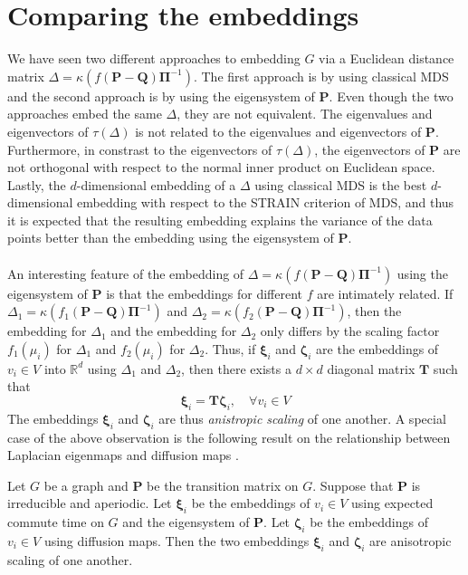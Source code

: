 \section{Comparing the embeddings}
\label{sec:comparing-embeddings}
\noindent
We have seen two different approaches to embedding $G$ via a Euclidean
distance matrix $\Delta = \kappa(f(\mathbf{P} -
\mathbf{Q})\bm{\Pi}^{-1})$. The first approach is by using classical
MDS and the second approach is by using the eigensystem of
$\mathbf{P}$.  Even though the two approaches embed the same $\Delta$,
they are not equivalent. The eigenvalues and eigenvectors of
$\tau(\Delta)$ is not related to the eigenvalues and eigenvectors of
$\mathbf{P}$. Furthermore, in constrast to the eigenvectors of
$\tau(\Delta)$, the eigenvectors of $\mathbf{P}$ are not orthogonal
with respect to the normal inner product on Euclidean space. Lastly,
the $d$-dimensional embedding of a $\Delta$ using classical MDS is the
best $d$-dimensional embedding with respect to the STRAIN criterion of
MDS, and thus it is expected that the resulting embedding explains the
variance of the data points better than the embedding using the
eigensystem of $\mathbf{P}$. \\ \\
\noindent
An interesting feature of the embedding of $\Delta =
\kappa(f(\mathbf{P} - \mathbf{Q})\bm{\Pi}^{-1}) $ using the
eigensystem of $\mathbf{P}$ is that the embeddings for different $f$
are intimately related. If $\Delta_1 = \kappa(f_1(\mathbf{P} -
\mathbf{Q})\bm{\Pi}^{-1})$ and $\Delta_2 = \kappa(f_2(\mathbf{P} -
\mathbf{Q})\bm{\Pi}^{-1})$, then the embedding for $\Delta_1$ and the
embedding for $\Delta_2$ only differs by the scaling factor
$f_1(\mu_i)$ for $\Delta_1$ and $f_2(\mu_i)$ for $\Delta_2$. Thus, if
$\bm{\xi}_i$ and $\bm{\zeta}_i$ are the embeddings of $v_i \in V$ into
$\mathbb{R}^{d}$ using $\Delta_1$ and $\Delta_2$, then there exists a
$d \times d$ diagonal matrix $\mathbf{T}$ such that
\begin{equation}
  \label{eq:123}
  \bm{\xi}_i = \mathbf{T} \bm{\zeta}_i, \quad \forall v_i \in V
\end{equation}
The embeddings $\bm{\xi}_i$ and $\bm{\zeta}_i$ are thus {\em
  anistropic scaling} of one another. A special case of the above
observation is the following result on the relationship between
Laplacian eigenmaps \cite{belkin03:_laplac} and diffusion maps
\cite{coifman06:_diffus_maps}.
\begin{proposition}
  \label{prop:27}
  Let $G$ be a graph and $\mathbf{P}$ be the transition matrix on
  $G$. Suppose that $\mathbf{P}$ is irreducible and aperiodic. Let
  $\bm{\xi}_i$ be the embeddings of $v_i \in V$ using expected commute
  time on $G$ and the eigensystem of $\mathbf{P}$. Let $\bm{\zeta}_i$
  be the embeddings of $v_i \in V$ using diffusion maps. Then the two
  embeddings $\bm{\xi}_i$ and $\bm{\zeta}_i$ are anisotropic scaling
  of one another.
\end{proposition}
